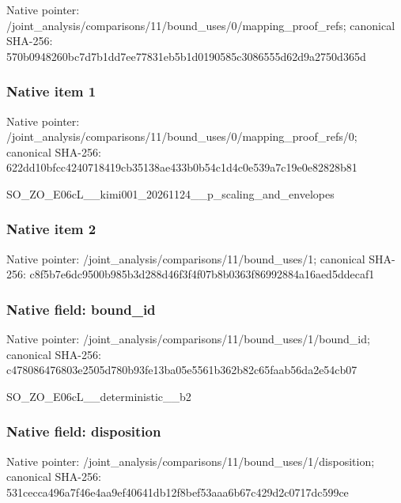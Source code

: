 \documentclass[10pt,a4paper]{article}
\begin{document}
Native pointer: /joint\_analysis/comparis\allowbreak{}ons/11/bound\_uses/0/mapp\allowbreak{}ing\_proof\_refs; canonical SHA-256: 570b0948260bc7d7b1dd7ee7\allowbreak{}7831eb5b1d0190585c308655\allowbreak{}5d62d9a2750d365d



\subsubsection{Native item 1}


Native pointer: /joint\_analysis/comparis\allowbreak{}ons/11/bound\_uses/0/mapp\allowbreak{}ing\_proof\_refs/0; canonical SHA-256: 622dd10bfcc4240718419cb3\allowbreak{}5138ae433b0b54c1d4c0e539\allowbreak{}a7c19e0e82828b81


SO\_ZO\_E06cL\_\_kimi001\_202\allowbreak{}61124\_\_p\_scaling\_and\_env\allowbreak{}elopes


\subsubsection{Native item 2}


Native pointer: /joint\_analysis/comparis\allowbreak{}ons/11/bound\_uses/1; canonical SHA-256: c8f5b7e6dc9500b985b3d288\allowbreak{}d46f3f4f07b8b0363f869928\allowbreak{}84a16aed5ddecaf1



\subsubsection{Native field: bound\_id}


Native pointer: /joint\_analysis/comparis\allowbreak{}ons/11/bound\_uses/1/boun\allowbreak{}d\_id; canonical SHA-256: c478086476803e2505d780b9\allowbreak{}3fe13ba05e5561b362b82c65\allowbreak{}faab56da2e54cb07


SO\_ZO\_E06cL\_\_deterministic\_\_b2


\subsubsection{Native field: disposition}


Native pointer: /joint\_analysis/comparis\allowbreak{}ons/11/bound\_uses/1/disp\allowbreak{}osition; canonical SHA-256: 531cecca496a7f46e4aa9ef4\allowbreak{}0641db12f8bef53aaa6b67c4\allowbreak{}29d2c0717dc599ce
\end{document}
